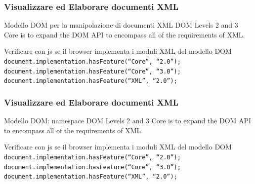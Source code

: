 
\begin{frame}
    \frametitle{Visualizzare ed Elaborare documenti XML}
    \addtocounter{nframe}{1}
    

     \begin{block}{Modello DOM per la manipolazione di documenti XML}
        DOM Levels 2 and 3 Core is to expand the DOM API to encompass all of the requirements of XML.
     \end{block}

     \begin{block}{Verificare con js se il browser implementa i moduli XML del modello DOM}
        \texttt{document.implementation.hasFeature(“Core”, “2.0”); }
        \\\texttt{document.implementation.hasFeature(“Core”, “3.0”);} 
        \\\texttt{document.implementation.hasFeature(“XML”, “2.0”);}
     \end{block}
     
\end{frame}

\begin{frame}
    \frametitle{Visualizzare ed Elaborare documenti XML}
    \addtocounter{nframe}{1}
    

     \begin{block}{Modello DOM: namespace}
        DOM Levels 2 and 3 Core is to expand the DOM API to encompass all of the requirements of XML.
     \end{block}

     \begin{block}{Verificare con js se il browser implementa i moduli XML del modello DOM}
        \texttt{document.implementation.hasFeature(“Core”, “2.0”); }
        \\\texttt{document.implementation.hasFeature(“Core”, “3.0”);} 
        \\\texttt{document.implementation.hasFeature(“XML”, “2.0”);}
     \end{block}
     
\end{frame}


